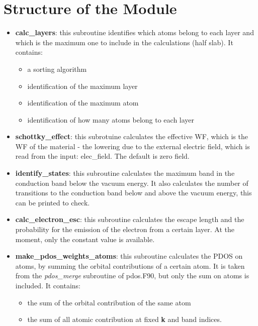 \documentclass[a4paper,11pt,twoside]{book}
\begin{document}
\chapter{Structure of the Module} \label{sec:structure}
\begin{itemize}
\item  {\bf calc\_layers}: this subroutine identifies which atoms
belong to each layer and which is the maximum one to include in the calculations (half slab).
It contains:
       \begin{itemize}
       \item a sorting algorithm
       \item identification of the maximum layer 
       \item identification of the maximum atom 
       \item identification of how many atoms belong to each layer 
       \end{itemize}

\item  {\bf schottky\_effect}: this subrotuine calculates
	the effective WF, which is the WF of the material -
	the lowering due to the external electric field,
	which is read from the input: elec\_field.
	The default is zero field.
\item  {\bf identify\_states}: this subroutine calculates the
       maximum band in the conduction band below the vacuum energy.
       It also calculates the number of transitions to the
       conduction band below and above the vacuum energy,
       this can be printed to check.
\item  {\bf calc\_electron\_esc}: this subroutine calculates the
	escape length and the probability
	for the emission of the electron from
	a certain layer. 
	At the moment, only the constant value is
	available.

\item  {\bf make\_pdos\_weights\_atoms}: this subroutine calculates the 
PDOS on atoms, by summing the orbital contributions
of a certain atom. It is taken from the {\it pdos\_merge} subroutine of
pdos.F90, but only the sum on atoms is included.
It contains:
       \begin{itemize}
       \item the sum of the orbital contribution of the same atom 
       \item the sum of all atomic contribution at fixed {\bf k}
and band indices.
       \end{itemize}


\end{itemize}
\end{document}
